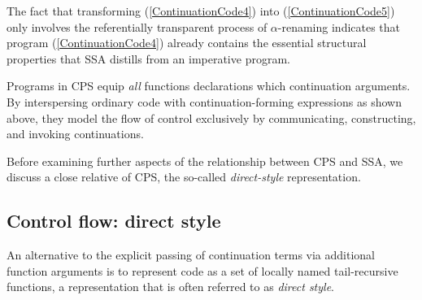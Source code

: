 { The fact that transforming (\ref{ContinuationCode4}) into
(\ref{ContinuationCode5}) only involves the referentially transparent
process of $\alpha$-renaming indicates that program
(\ref{ContinuationCode4}) already contains the essential structural
properties that SSA distills from an imperative program.

Programs in CPS equip \emph{all} functions declarations which
continuation arguments. By interspersing ordinary code with
continuation-forming expressions as shown above, they model the flow
of control exclusively by communicating, constructing, and invoking
continuations.

Before examining further aspects of the relationship between CPS and
SSA, we discuss a close relative of CPS, the so-called
\emph{direct-style} representation.


\subsection{Control flow: direct style}
\label{section:Part1:Semantics:DirectStyle}
An alternative to the explicit passing of continuation terms via
additional function arguments is to represent code as a set of locally
named tail-recursive functions, a representation that is often
referred to as \emph{direct style}.

}
